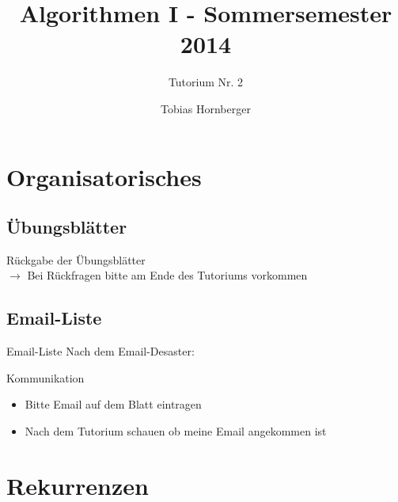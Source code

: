 \documentclass[18pt]{beamer}
\title[Algo Tutorium Nr.2]{Algorithmen I - Sommersemester 2014}
\subtitle{Tutorium Nr. 2}
\author{Tobias Hornberger}
\institute{Institut für Theoretische Informatik}
\begin{document}

\begin{frame}
\titlepage
\end{frame}


\section{Organisatorisches}
\subsection{Übungsblätter}
	\begin{frame}
		\begin{center}
			\huge{Rückgabe der Übungsblätter} \\
			\parskip 36pt
			\normalsize{$\rightarrow$ Bei Rückfragen bitte am Ende des Tutoriums vorkommen}
		\end{center}
	\end{frame}

\subsection{Email-Liste}

	\begin{frame}{Email-Liste}
		Nach dem Email-Desaster: \\
		\parskip 20pt
		\begin{block}{Kommunikation}
			\begin{itemize}
				\item Bitte Email auf dem Blatt eintragen
				\item Nach dem Tutorium schauen ob meine Email angekommen ist
			\end{itemize}
		\end{block}
	\end{frame}

\section{Rekurrenzen}
\end{document}

